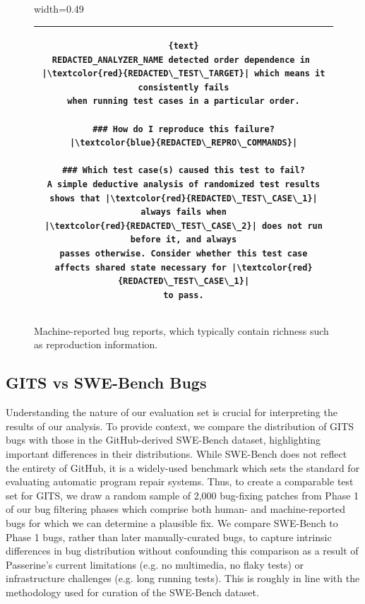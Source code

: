 \begin{figure}[h]
\begin{adjustbox}{width=0.49\textwidth}
\begin{tabular}{c}
\begin{minipage}[t]{0.45\textwidth}
\begin{lstlisting}[escapeinside=||, breaklines=true]{text}
REDACTED_ANALYZER_NAME detected order dependence in 
|\textcolor{red}{REDACTED\_TEST\_TARGET}| which means it consistently fails
when running test cases in a particular order.

### How do I reproduce this failure?
|\textcolor{blue}{REDACTED\_REPRO\_COMMANDS}|

### Which test case(s) caused this test to fail?
A simple deductive analysis of randomized test results
shows that |\textcolor{red}{REDACTED\_TEST\_CASE\_1}| always fails when
|\textcolor{red}{REDACTED\_TEST\_CASE\_2}| does not run before it, and always
passes otherwise. Consider whether this test case
affects shared state necessary for |\textcolor{red}{REDACTED\_TEST\_CASE\_1}|
to pass.
\end{lstlisting}
\end{minipage}\\
\bottomrule
\end{tabular}
\end{adjustbox}
\vspace{-0.0cm}
\caption{Machine-reported bug reports, which typically contain richness such as reproduction information.}
\vspace{-0.0cm}
\label{fig:bug-reports}
\end{figure}






\subsection{GITS vs SWE-Bench Bugs}
Understanding the nature of our evaluation set is crucial for interpreting the results of our analysis. To provide context, we compare the distribution of GITS bugs with those in the GitHub-derived SWE-Bench dataset, highlighting important differences in their distributions.
While SWE-Bench does not reflect the entirety of GitHub, it is a widely-used benchmark which sets the standard for evaluating automatic program repair systems.
Thus, to create a comparable test set for GITS, we draw a random sample of 2,000 bug-fixing patches from Phase 1 of our bug filtering phases which comprise both human- and machine-reported bugs for which we can determine a plausible fix. We compare SWE-Bench to Phase 1 bugs, rather than later manually-curated bugs, to capture intrinsic differences in bug distribution without confounding this comparison as a result of Passerine's current limitations (e.g. no multimedia, no flaky tests) or infrastructure challenges (e.g. long running tests).%
This is roughly in line with the methodology used for curation of the SWE-Bench dataset.


